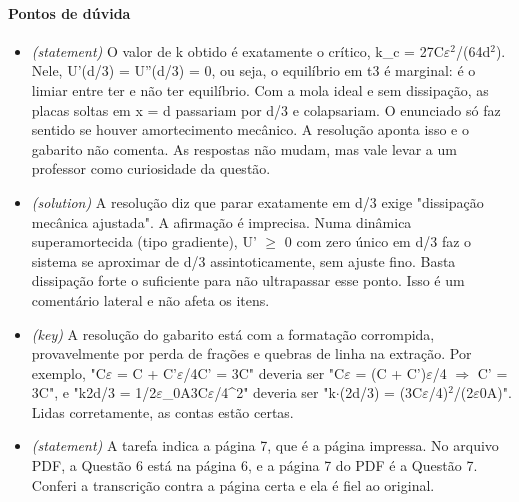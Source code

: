 \documentclass{article}%
\begin{document}
\paragraph{Pontos de dúvida}%
\begin{itemize}%
\item%
\textit{(statement)} O valor de k obtido é exatamente o crítico, k\_c = 27C$\varepsilon$$^2$/(64d$^2$). Nele, U'(d/3) = U''(d/3) = 0, ou seja, o equilíbrio em t3 é marginal: é o limiar entre ter e não ter equilíbrio. Com a mola ideal e sem dissipação, as placas soltas em x = d passariam por d/3 e colapsariam. O enunciado só faz sentido se houver amortecimento mecânico. A resolução aponta isso e o gabarito não comenta. As respostas não mudam, mas vale levar a um professor como curiosidade da questão.%
\item%
\textit{(solution)} A resolução diz que parar exatamente em d/3 exige "dissipação mecânica ajustada". A afirmação é imprecisa. Numa dinâmica superamortecida (tipo gradiente), U' $\geq$ 0 com zero único em d/3 faz o sistema se aproximar de d/3 assintoticamente, sem ajuste fino. Basta dissipação forte o suficiente para não ultrapassar esse ponto. Isso é um comentário lateral e não afeta os itens.%
\item%
\textit{(key)} A resolução do gabarito está com a formatação corrompida, provavelmente por perda de frações e quebras de linha na extração. Por exemplo, "C$\varepsilon$ = C + C'$\varepsilon$/4C' = 3C" deveria ser "C$\varepsilon$ = (C + C')$\varepsilon$/4 $\Rightarrow$ C' = 3C", e "k2d/3 = 1/2$\varepsilon$\_0A3C$\varepsilon$/4\^{}2" deveria ser "k$\cdot$(2d/3) = (3C$\varepsilon$/4)$^2$/(2$\varepsilon$0A)". Lidas corretamente, as contas estão certas.%
\item%
\textit{(statement)} A tarefa indica a página 7, que é a página impressa. No arquivo PDF, a Questão 6 está na página 6, e a página 7 do PDF é a Questão 7. Conferi a transcrição contra a página certa e ela é fiel ao original.%
\end{itemize}%
\end{document}
